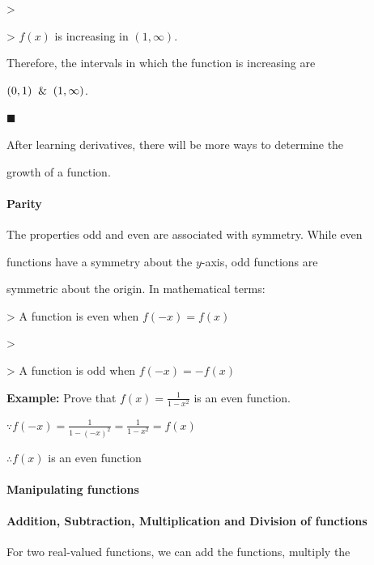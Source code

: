 >

> $f(x)$ is increasing in $(1,\infty)$.



Therefore, the intervals in which the function is increasing are

$(0,1)\And(1,\infty)$.



$\blacksquare$



After learning derivatives, there will be more ways to determine the

growth of a function.



\paragraph{Parity}



The properties odd and even are associated with symmetry. While even

functions have a symmetry about the $y$-axis, odd functions are

symmetric about the origin. In mathematical terms:



> A function is even when $f(-x)=f(x)$

>

> A function is odd when $f(-x)=-f(x)$



\textbf{Example:} Prove that $f(x)=\frac{1}{1-x^2}$ is an even function.



$\because f(-x)=\frac{1}{1-(-x)^2}=\frac{1}{1-x^2}=f(x)$



$\therefore f(x)$ is an even function



\paragraph{Manipulating functions}



\paragraph{Addition, Subtraction, Multiplication and Division of functions}



For two real-valued functions, we can add the functions, multiply the

